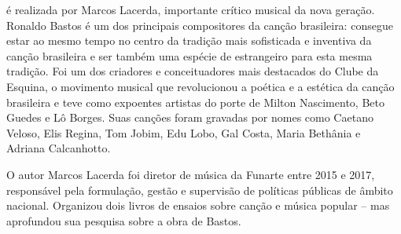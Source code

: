 \hspace*{-7cm}\hrulefill\hspace*{-7cm}

\medskip

 é  realizada por Marcos Lacerda, importante crítico musical da nova geração. Ronaldo Bastos é um dos principais compositores da canção brasileira: consegue estar ao mesmo tempo no centro da tradição mais sofisticada e inventiva da canção brasileira e ser também uma espécie de estrangeiro para esta mesma tradição. Foi um dos criadores e conceituadores mais destacados do Clube da Esquina, o movimento musical que revolucionou a poética e a estética da canção brasileira e teve como expoentes artistas do porte de Milton Nascimento, Beto Guedes e Lô Borges. Suas canções foram gravadas por nomes como Caetano Veloso, Elis Regina, Tom Jobim, Edu Lobo, Gal Costa, Maria Bethânia e Adriana Calcanhotto.

O autor Marcos Lacerda foi diretor de música da Funarte entre 2015 e 2017, responsável pela formulação, gestão e supervisão de políticas públicas de âmbito nacional. Organizou dois livros de ensaios sobre canção e música popular – mas aprofundou sua pesquisa sobre a obra de Bastos.

\vfill

\hspace*{-.4cm}\begin{minipage}[c]{1\linewidth}
\small{
{}}
\end{minipage}

\pagebreak

